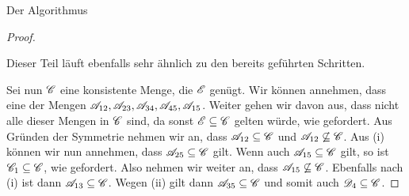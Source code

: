 \begin{section}{Der Algorithmus}
\begin{proof}
\begin{enumerate}[(i)]
   Dieser Teil läuft ebenfalls sehr ähnlich zu den bereits geführten Schritten.
  \end{enumerate}
  Sei nun $\mathscr{C}$ eine konsistente Menge, die $\mathscr{E}$ genügt. Wir können annehmen, dass eine der Mengen $\mathscr{A}_{12},\mathscr{A}_{23},\mathscr{A}_{34},\mathscr{A}_{45},\mathscr{A}_{15}$. Weiter gehen wir davon aus, dass nicht alle dieser Mengen in $\mathscr{C}$ sind, da sonst $\mathscr{E}\subseteq\mathscr{C}$ gelten würde, wie gefordert. Aus Gründen der Symmetrie nehmen wir an, dass $\mathscr{A}_{12}\subseteq\mathscr{C}$ und $\mathscr{A}_{12}\not\subseteq\mathscr{C}$. Aus (i) können wir nun annehmen, dass $\mathscr{A}_{25}\subseteq\mathscr{C}$ gilt. Wenn auch $\mathscr{A}_{15}\subseteq\mathscr{C}$ gilt, so ist $\mathscr{C}_1\subseteq\mathscr{C}$, wie gefordert. Also nehmen wir weiter an, dass $\mathscr{A}_{15}\not\subseteq\mathscr{C}$. Ebenfalls nach (i) ist dann $\mathscr{A}_{13}\subseteq\mathscr{C}$. Wegen (ii) gilt dann $\mathscr{A}_{35}\subseteq\mathscr{C}$ und somit auch $\mathscr{D}_4\subseteq\mathscr{C}$.
 \end{proof}
\end{section}